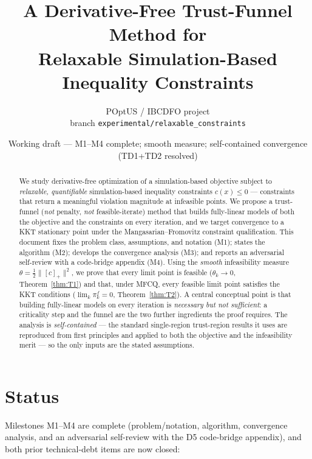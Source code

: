 \documentclass[11pt]{article}
\title{A Derivative-Free Trust-Funnel Method for\\
       Relaxable Simulation-Based Inequality Constraints}
\author{POptUS / IBCDFO project\\
        \small branch \texttt{experimental/relaxable\_constraints}}
\date{Working draft --- M1--M4 complete; smooth measure; self-contained convergence (TD1+TD2 resolved)}
\theoremstyle{definition}
\theoremstyle{plain}
\begin{document}
\maketitle

\begin{abstract}
We study derivative-free optimization of a simulation-based objective subject to
\emph{relaxable, quantifiable} simulation-based inequality constraints
$c(x)\le0$ --- constraints that return a meaningful violation magnitude at
infeasible points. We propose a trust-funnel (\emph{not} penalty, \emph{not}
feasible-iterate) method that builds fully-linear models of both the objective
and the constraints on every iteration, and we target convergence to a KKT
stationary point under the Mangasarian--Fromovitz constraint qualification. This
document fixes the problem class, assumptions, and notation (M1); states the
algorithm (M2); develops the convergence analysis (M3); and reports an adversarial
self-review with a code-bridge appendix (M4). Using the \emph{smooth} infeasibility
measure $\theta=\tfrac12\|[c]_+\|^2$, we prove that every limit point is feasible
($\theta_k\to0$, Theorem~\ref{thm:T1}) and that, under MFCQ, every feasible limit
point satisfies the KKT conditions ($\lim_k\pi_k^f=0$, Theorem~\ref{thm:T2}). A
central conceptual point is that building fully-linear models on every iteration is
\emph{necessary but not sufficient}: a criticality step and the funnel are the two
further ingredients the proof requires. The analysis is \emph{self-contained} --- the
standard single-region trust-region results it uses are reproduced from first
principles and applied to both the objective and the infeasibility merit --- so the
only inputs are the stated assumptions.
\end{abstract}

\tableofcontents
\bigskip








\section*{Status}
Milestones M1--M4 are complete (problem/notation, algorithm, convergence analysis,
and an adversarial self-review with the D5 code-bridge appendix), and both prior
technical-debt items are now closed:
\end{document}

